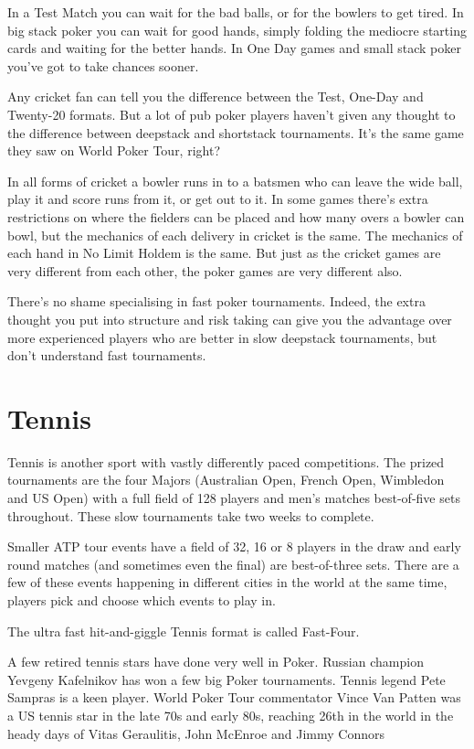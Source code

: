 In a Test Match you can wait for the bad balls, or for the bowlers to
get tired. In big stack poker you can wait for good hands, simply folding the
mediocre starting cards and waiting for the better hands. In One Day games
and small stack poker you've got to take chances sooner.

Any cricket fan can tell you the difference between the Test,
One-Day and Twenty-20 formats. But a lot of pub poker players haven't given any
thought to the difference between deepstack and shortstack
tournaments. It's the same game they saw on World Poker Tour,
right?

In all forms of cricket a bowler runs in to a batsmen who
can leave the wide ball, play it and score runs from it, or get out
to it. In some games there's extra restrictions on where the
fielders can be placed and how many overs a bowler
can bowl, but the mechanics of each delivery in cricket is the same.
The mechanics of each hand in No Limit Holdem is the same.
But just as the cricket games are very different from each other, the 
poker games are very different also.

There's no shame specialising in fast poker tournaments. Indeed,
the extra thought you put into structure and risk taking can give
you the advantage over more experienced players who are better in
slow deepstack tournaments, but don't understand fast tournaments.

\section{Tennis}

Tennis is another sport with vastly differently paced competitions.
The prized tournaments are the four Majors (Australian Open,
French Open, Wimbledon and US Open) with a full field of 128 players
and men's matches best-of-five sets throughout. These slow tournaments
take two weeks to complete.

Smaller ATP tour events have a field of 32, 16 or 8 players in the draw
and early round matches (and sometimes even the final) are best-of-three
sets. There are a few of these events happening in different cities in
the world at the same time, players pick and choose which events
to play in.

The ultra fast hit-and-giggle Tennis format is called Fast-Four.

A few retired tennis stars have done very well in Poker. Russian
champion Yevgeny Kafelnikov has won a few big Poker tournaments.
Tennis legend Pete Sampras is a keen player. World Poker Tour
commentator Vince Van Patten was a US tennis star in the late
70s and early 80s, reaching 26th in the world in the heady days
of Vitas Geraulitis, John McEnroe and Jimmy Connors

